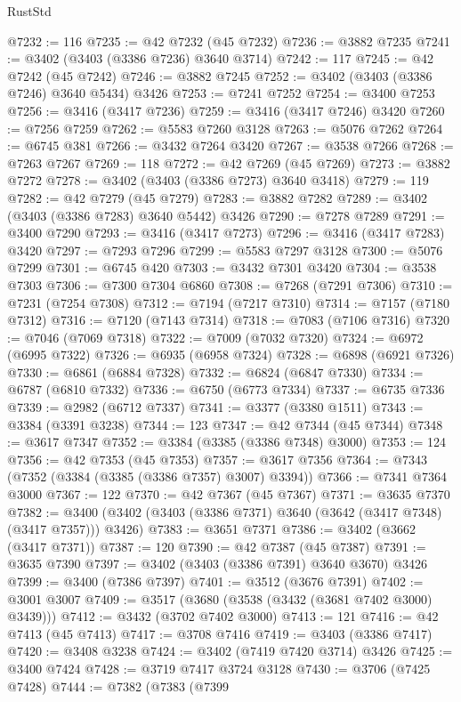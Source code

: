 \begin{lexlean}{RustStd}
\begin{coremodule}
@7232 := 116
@7235 := @42 @7232 (@45 @7232)
@7236 := @3882 @7235
@7241 := @3402 (@3403 (@3386 @7236) @3640 @3714)
@7242 := 117
@7245 := @42 @7242 (@45 @7242)
@7246 := @3882 @7245
@7252 := @3402 (@3403 (@3386 @7246) @3640 @5434) @3426
@7253 := @7241 @7252
@7254 := @3400 @7253
@7256 := @3416 (@3417 @7236)
@7259 := @3416 (@3417 @7246) @3420
@7260 := @7256 @7259
@7262 := @5583 @7260 @3128
@7263 := @5076 @7262
@7264 := @6745 @381
@7266 := @3432 @7264 @3420
@7267 := @3538 @7266
@7268 := @7263 @7267
@7269 := 118
@7272 := @42 @7269 (@45 @7269)
@7273 := @3882 @7272
@7278 := @3402 (@3403 (@3386 @7273) @3640 @3418)
@7279 := 119
@7282 := @42 @7279 (@45 @7279)
@7283 := @3882 @7282
@7289 := @3402 (@3403 (@3386 @7283) @3640 @5442) @3426
@7290 := @7278 @7289
@7291 := @3400 @7290
@7293 := @3416 (@3417 @7273)
@7296 := @3416 (@3417 @7283) @3420
@7297 := @7293 @7296
@7299 := @5583 @7297 @3128
@7300 := @5076 @7299
@7301 := @6745 @420
@7303 := @3432 @7301 @3420
@7304 := @3538 @7303
@7306 := @7300 @7304 @6860
@7308 := @7268 (@7291 @7306)
@7310 := @7231 (@7254 @7308)
@7312 := @7194 (@7217 @7310)
@7314 := @7157 (@7180 @7312)
@7316 := @7120 (@7143 @7314)
@7318 := @7083 (@7106 @7316)
@7320 := @7046 (@7069 @7318)
@7322 := @7009 (@7032 @7320)
@7324 := @6972 (@6995 @7322)
@7326 := @6935 (@6958 @7324)
@7328 := @6898 (@6921 @7326)
@7330 := @6861 (@6884 @7328)
@7332 := @6824 (@6847 @7330)
@7334 := @6787 (@6810 @7332)
@7336 := @6750 (@6773 @7334)
@7337 := @6735 @7336
@7339 := @2982 (@6712 @7337)
@7341 := @3377 (@3380 @1511)
@7343 := @3384 (@3391 @3238)
@7344 := 123
@7347 := @42 @7344 (@45 @7344)
@7348 := @3617 @7347
@7352 := @3384 (@3385 (@3386 @7348) @3000)
@7353 := 124
@7356 := @42 @7353 (@45 @7353)
@7357 := @3617 @7356
@7364 := @7343 (@7352 (@3384 (@3385 (@3386 @7357) @3007) @3394))
@7366 := @7341 @7364 @3000
@7367 := 122
@7370 := @42 @7367 (@45 @7367)
@7371 := @3635 @7370
@7382 := @3400 (@3402 (@3403 (@3386 @7371) @3640 (@3642 (@3417 @7348) (@3417 @7357))) @3426)
@7383 := @3651 @7371
@7386 := @3402 (@3662 (@3417 @7371))
@7387 := 120
@7390 := @42 @7387 (@45 @7387)
@7391 := @3635 @7390
@7397 := @3402 (@3403 (@3386 @7391) @3640 @3670) @3426
@7399 := @3400 (@7386 @7397)
@7401 := @3512 (@3676 @7391)
@7402 := @3001 @3007
@7409 := @3517 (@3680 (@3538 (@3432 (@3681 @7402 @3000) @3439)))
@7412 := @3432 (@3702 @7402 @3000)
@7413 := 121
@7416 := @42 @7413 (@45 @7413)
@7417 := @3708 @7416
@7419 := @3403 (@3386 @7417)
@7420 := @3408 @3238
@7424 := @3402 (@7419 @7420 @3714) @3426
@7425 := @3400 @7424
@7428 := @3719 @7417 @3724 @3128
@7430 := @3706 (@7425 @7428)
@7444 := @7382
    (@7383
      (@7399

\end{coremodule}
\end{lexlean}
